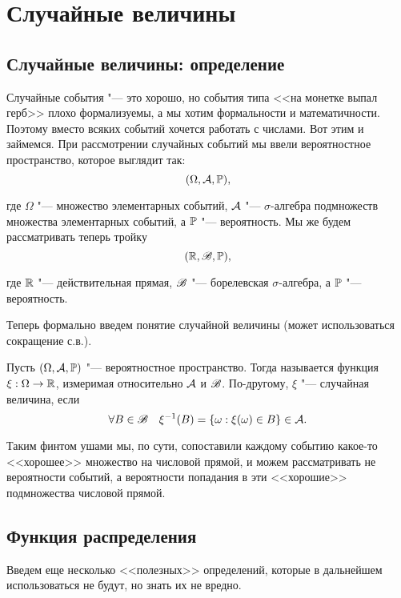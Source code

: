\documentclass[../TV&MS.tex]{subfiles}
\begin{document}
    
\section{Случайные величины}

\subsection{Случайные величины: определение}

\qquad Случайные события "--- это хорошо, но события типа <<на монетке выпал герб>> плохо формализуемы, 
а мы хотим формальности и математичности. Поэтому вместо всяких событий хочется работать с числами. 
Вот этим и займемся. При рассмотрении случайных событий мы ввели вероятностное пространство, 
которое выглядит так:
$$(\Omega, \mathcal{A}, \mathbb{P}),$$

где $\Omega$ "--- множество элементарных событий, $\mathcal{A}$ "--- $\sigma$-алгебра подмножеств 
множества элементарных событий, а $\mathbb{P}$ "--- вероятность. Мы же будем рассматривать теперь тройку
$$(\mathbb{R}, \mathscr{B}, \mathbb{P}),$$

где $\mathbb{R}$ "--- действительная прямая, $\mathscr{B}$ "--- борелевская $\sigma$-алгебра, а $\mathbb{P}$ "--- вероятность.


Теперь формально введем понятие случайной величины (может использоваться сокращение с.в.).

\begin{Def}
Пусть $(\Omega, \mathcal{A}, \mathbb{P})$ "--- вероятностное пространство. Тогда  
называется функция $\xi : \Omega \to \mathbb{R}$, измеримая относительно $\mathcal{A}$ и $\mathscr{B}$. 
По-другому, $\xi$ "--- случайная величина, если
$$\forall B \in \mathscr{B} \quad \xi^{-1}(B) = \lbrace \omega : \xi(\omega) \in B \rbrace \in \mathcal{A}.$$
\end{Def}

\begin{Wtf}
Таким финтом ушами мы, по сути, сопоставили каждому событию какое-то <<хорошее>> множество на 
числовой прямой, и можем рассматривать не вероятности событий, а вероятности попадания в эти 
<<хорошие>> подмножества числовой прямой.
\end{Wtf}

\subsection{Функция распределения}

Введем еще несколько <<полезных>> определений, которые в дальнейшем использоваться не будут,
но знать их не вредно.
\end{document}
